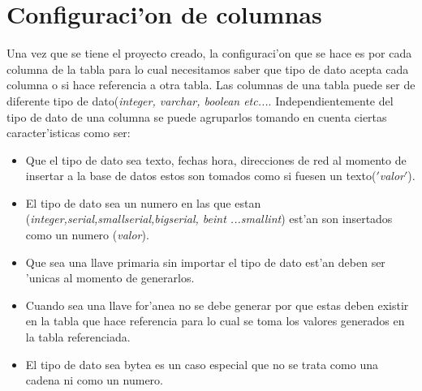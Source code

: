 \section{Configuraci'on de columnas}
Una vez que se tiene el proyecto creado, la configuraci'on que se hace es por cada columna de la tabla para lo cual necesitamos saber que tipo de dato acepta cada columna o si hace referencia a otra tabla.
Las columnas de una tabla puede ser de diferente tipo de dato(\textit{integer, varchar, boolean etc...}. Independientemente del tipo de dato de una columna se puede agruparlos tomando en cuenta ciertas caracter'isticas como ser:
\begin{itemize}
\item Que el tipo de dato sea texto, fechas hora, direcciones de red al momento de insertar a la base de datos estos son tomados como si fuesen un texto($'$\textit{valor}$'$).
\item El tipo de dato sea un numero en las que estan (\textit{integer,serial,smallserial,bigserial, beint ...smallint}) est'an son insertados como un numero (\textit{valor}).
\item Que sea una llave primaria sin importar el tipo de dato est'an deben ser 'unicas al momento de generarlos.
\item Cuando sea una llave for'anea no se debe generar por que estas deben existir en la tabla que hace referencia para lo cual se toma los valores generados en la tabla referenciada.
\item El tipo de dato sea bytea es un caso especial que no se trata como una cadena ni como un numero.
\end{itemize}
